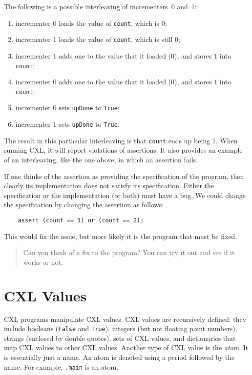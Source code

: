 \documentclass{report}
\newenvironment{code}{
\tcolorbox
}{
\endtcolorbox
}
\begin{document}
The following is a possible interleaving of incrementers~0 and~1:
\begin{enumerate}
\item incrementer 0 loads the value of \texttt{count}, which is 0;
\item incrementer 1 loads the value of \texttt{count}, which is still 0;
\item incrementer 1 adds one to the value that it loaded (0), and
stores $1$ into \texttt{count};
\item incrementer 0 adds one to the value that it loaded (0), and
stores $1$ into \texttt{count};
\item incrementer 0 sets \texttt{upDone} to \texttt{True};
\item incrementer 1 sets \texttt{upDone} to \texttt{True}.
\end{enumerate}

The result in this particular interleaving is that \texttt{count} ends up
being 1.  When running CXL, it will
report violations of assertions.  It also provides an example
of an interleaving, like the one above, in which an assertion fails.

If one thinks of the assertion as providing the specification of the
program, then clearly its implementation does not satisfy its specification.
Either the specification or the implementation (or both) must have a bug.
We could change the specification by changing the assertion as follows:

\begin{code}
\begin{verbatim}
    assert (count == 1) or (count == 2);
\end{verbatim}
\end{code}

This would fix the issue, but more likely it is the program that must
be fixed.

\begin{quote}
Can you think of a fix to the program?  You can try it out and see
if it works or not.
\end{quote}

\chapter{CXL Values}
\label{ch:cxlvalues}

CXL programs manipulate CXL values.
CXL values are recursively defined:
they include booleans (\texttt{False} and \texttt{True}),
integers (but not floating point numbers),
strings (enclosed by double quotes),
sets of CXL values,
and dictionaries that map CXL values to other CXL values.
%
Another type of CXL value is the \emph{atom}.  It is essentially
just a name.  An atom is denoted using a period followed by the
name.  For example, \texttt{.main} is an atom.
\end{document}
